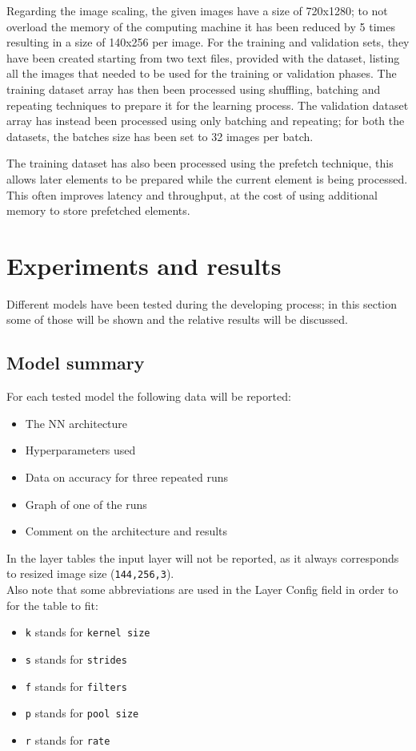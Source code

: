 \documentclass[a4paper,12pt]{article}
\begin{document}
Regarding the image scaling, the given images have a size of 720x1280; to not overload the memory of the computing machine it has been reduced by 5 times resulting in a size of 140x256 per image.
For the training and validation sets, they have been created starting from two text files, provided with the dataset, listing all the images that needed to be used for the training or validation phases.
The training dataset array has then been processed using shuffling, batching and repeating techniques to prepare it for the learning process.
The validation dataset array has instead been processed using only batching and repeating; for both the datasets, the batches size has been 
set to 32 images per batch.

The training dataset has also been processed using the prefetch technique, this
allows later elements to be prepared while the current element is being
processed. This often improves latency and throughput, at the cost of
using additional memory to store prefetched elements.


\newpage
\section{Experiments and results}
Different models have been tested during the developing process; in this section some of those will be shown and the relative results will be discussed.
\subsection{Model summary}
For each tested model the following data will be reported:
\begin{itemize}
\item The NN architecture
\item Hyperparameters used
\item Data on accuracy for three repeated runs
\item Graph of one of the runs
\item Comment on the architecture and results
\end{itemize}
In the layer tables the input  layer will not be reported, as it always corresponds to resized image size (\texttt{144,256,3}).\\
Also note that some abbreviations are used in the Layer Config field in order to for the table to fit:
\begin{itemize}
\item \texttt{k} stands for \texttt{kernel size}
\item \texttt{s} stands for \texttt{strides}
\item \texttt{f} stands for \texttt{filters}
\item \texttt{p} stands for \texttt{pool size}
\item \texttt{r} stands for \texttt{rate}
\end{itemize}
\end{document}
